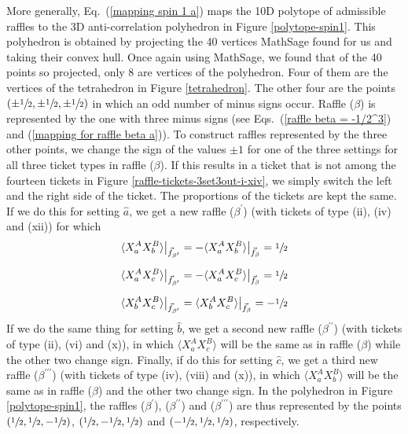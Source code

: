 More generally, Eq.\ (\ref{mapping spin 1 a}) maps the 10D polytope of admissible raffles to the 3D anti-correlation polyhedron in Figure \ref{polytope-spin1}. This polyhedron is obtained by projecting the 40 vertices MathSage found for us and taking their convex hull. Once again using MathSage, we found that of the 40 points so projected, only 8 are vertices of the polyhedron. Four of them are the vertices of the tetrahedron in Figure \ref{tetrahedron}. The other four are the points $\left(\pm \sfrac12,\pm \sfrac 12,\pm \sfrac12\right)$ in which an odd number of minus signs occur. Raffle ($\beta$) is represented by the one with three minus signs (see Eqs.\ (\ref{raffle beta = -1/2^3}) and (\ref{mapping for raffle beta a})). To construct raffles represented by the three other points, we change the sign of the values $\pm 1$ for one of the three settings for all three ticket types in raffle ($\beta$). If this results in a ticket that is not among the fourteen tickets in Figure \ref{raffle-tickets-3set3out-i-xiv}, we simply switch the left and the right side of the ticket. The proportions of the tickets are kept the same. If we do this for setting $\hat{a}$, we get a new raffle ($\beta^{\prime}$) (with tickets of type (ii), (iv) and (xii)) for which
\begin{eqnarray}
\langle X^A_a X^B_b \rangle  \big|_{\vec{f}_{\beta^\prime}} = - \langle X^A_a X^B_b \rangle  \big|_{\vec{f}_\beta} = \sfrac12 \\[.2cm]
\langle X^A_a X^B_c \rangle  \big|_{\vec{f}_{\beta^\prime}} = - \langle X^A_a X^B_c \rangle  \big|_{\vec{f}_\beta} = \sfrac12 \\[.2cm]
\langle X^A_b X^B_c \rangle \big|_{\vec{f}_{\beta^\prime}}  = \langle X^A_b X^B_c \rangle  \big|_{\vec{f}_\beta} = - \sfrac12
\label{other vertices for spin 1}
\end{eqnarray}
If we do the same thing for setting $\hat{b}$, we get a second new raffle ($\beta^{\prime\prime}$) (with tickets of type (ii), (vi) and (x)), in which $\langle X^A_a X^B_c \rangle$ will be the same as in raffle ($\beta$) while the other two change sign. Finally, if do this for setting $\hat{c}$, we get a third new raffle ($\beta^{\prime\prime\prime}$) (with tickets of type (iv), (viii) and (x)), in which $\langle X^A_a X^B_b \rangle$ will be the same as in raffle ($\beta$) and the other two change sign. In the polyhedron in Figure \ref{polytope-spin1}, the raffles ($\beta^\prime$), ($\beta^{\prime\prime}$)  and  ($\beta^{\prime\prime\prime}$) are thus represented by the points $\left( \sfrac12, \sfrac 12,-\sfrac12\right)$, $\left(\sfrac12, - \sfrac 12, \sfrac12\right)$ and $\left( -\sfrac12, \sfrac 12,\sfrac12\right)$, respectively. 


